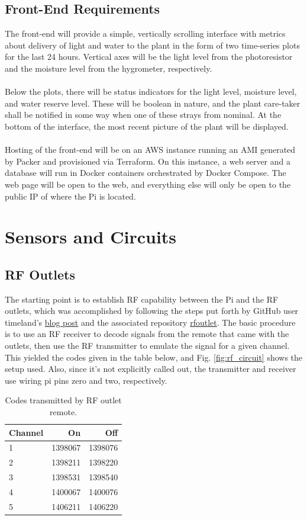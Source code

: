 \documentclass[]{article}
\begin{document}
\subsection{Front-End Requirements}
The front-end will provide a simple, vertically scrolling interface with metrics about delivery of light and water to the plant in the form of two time-series plots for the last 24 hours.  Vertical axes will be the light level from the photoresistor and the moisture level from the hygrometer, respectively.
\\\\
Below the plots, there will be status indicators for the light level, moisture level, and water reserve level.  These will be boolean in nature, and the plant care-taker shall be notified in some way when one of these strays from nominal.  At the bottom of the interface, the most recent picture of the plant will be displayed.
\\\\
Hosting of the front-end will be on an AWS instance running an AMI generated by Packer and provisioned via Terraform.  On this instance, a web server and a database will run in Docker containers orchestrated by Docker Compose.  The web page will be open to the web, and everything else will only be open to the public IP of where the Pi is located.

\section{Sensors and Circuits}
\subsection{RF Outlets}
The starting point is to establish RF capability between the Pi and the RF outlets, which was accomplished by following the steps put forth by GitHub user timeland's \href{https://timleland.com/wireless-power-outlets/}{blog post} and the associated repository \href{https://github.com/timleland/rfoutlet}{rfoutlet}.  The basic procedure is to use an RF receiver to decode signals from the remote that came with the outlets, then use the RF transmitter to emulate the signal for a given channel.  This yielded the codes given in the table below, and Fig. \ref{fig:rf_circuit} shows the setup used.  Also, since it's not explicitly called out, the transmitter and receiver use wiring pi pins zero and two, respectively.  


\begin{table}[h]
\centering
\caption{Codes transmitted by RF outlet remote.}
\begin{tabular}{l|r|r}
	\textbf{Channel} & \textbf{On} &	\textbf{Off}
\\ \hline
	1 &	1398067	& 1398076
\\ \hline
	2 &	1398211	& 1398220
\\ \hline
	3 &	1398531 &1398540
\\ \hline
	4 &	1400067 &1400076
\\ \hline
	5 &	1406211	& 1406220\\
\end{tabular}	
\end{table}
\end{document}
